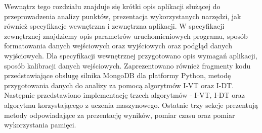 Wewnątrz tego rozdziału znajduje się krótki opis aplikacji służącej do przeprowadzenia analizy punktów, prezentacja wykorzystanych narzędzi, jak również specyfikacje wewnętrzna i zewnętrzna aplikacji. W specyfikacji zewnętrznej znajdziemy opis parametrów uruchomieniowych programu, sposób formatowania danych wejściowych oraz wyjściowych oraz podgląd danych wyjściowych. Dla specyfikacji wewnętrznej przygotowano opis wymagań aplikacji, sposób kalibracji danych wejściowych. Zaprezentowano również fragmenty kodu przedstawiające obsługę silnika MongoDB dla platformy Python, metodę przygotowania danych do analizy za pomocą algorytmów I-VT oraz I-DT. Następnie przedstawiono implementację trzech algorytmów - I-VT, I-DT oraz algorytmu korzystającego z uczenia maszynowego. Ostatnie trzy sekcje prezentują metody odpowiadające za prezentację wyników, pomiar czasu oraz pomiar wykorzystania pamięci. 
